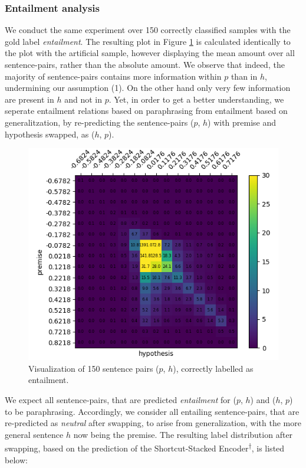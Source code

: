 \subsubsection{Entailment analysis}
We conduct the same experiment over 150 correctly classified samples with the gold label \textit{entailment}. The resulting plot in Figure \ref{fig:entailment_uninversed} is calculated identically to the plot with the artificial sample, however displaying the mean amount over all sentence-pairs, rather than the absolute amount. We observe that indeed, the majority of sentence-pairs contains more information within $p$ than in $h$, undermining our  assumption (1). On the other hand only very few information are present in $h$ and not in $p$. Yet, in order to get a better understanding, we seperate entailment relations based on paraphrasing from entailment based on generalitzation, by re-predicting the sentence-pairs ($p$, $h$) with premise and hypothesis swapped, as ($h$, $p$). 
\begin{figure}[tph!]	\centering
\includegraphics[totalheight=6.5cm]{fig/entailment_uninversed.png}
	\caption{Visualization of 150 sentence pairs ($p$, $h$), correctly labelled as entailment.}
	\label{fig:entailment_uninversed}
\end{figure}
We expect all sentence-pairs, that are predicted \textit{entailment} for ($p$, $h$) and ($h$, $p$) to be paraphrasing. Accordingly, we consider all entailing sentence-pairs, that are re-predicted as \textit{neutral} after swapping, to arise from generalization, with the more general sentence $h$ now being the premise. The resulting label distribution after swapping, based on the prediction of the Shortcut-Stacked Encoder\textsuperscript{$\dagger$}, is listed below:
